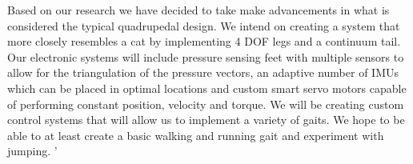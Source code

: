 
        
        



Based on our research we have decided to take make advancements in what is considered the typical quadrupedal design. We intend on creating a system that more closely resembles a cat by implementing 4 DOF legs and a continuum tail. Our electronic systems will include pressure sensing feet with multiple sensors to allow for the triangulation of the pressure vectors, an adaptive number of IMUs which can be placed in optimal locations and custom smart servo motors capable of performing constant position, velocity and torque. We will be creating custom control systems that will allow us to implement a variety of gaits. We hope to be able to at least create a basic walking and running gait and experiment with jumping.
'